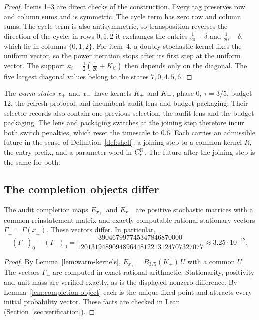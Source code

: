 \begin{proof}
Items 1--3 are direct checks of the construction. Every tag preserves row and column sums and is symmetric. The cycle term has zero row and column sums. The cycle term is also antisymmetric, so transposition reverses the direction of the cycle; in rows $0,1,2$ it exchanges the entries $\tfrac1{20}+\delta$ and $\tfrac1{20}-\delta$, which lie in columns $\{0,1,2\}$. For item~4, a doubly stochastic kernel fixes the uniform vector, so the power iteration stops after its first step at the uniform vector. The support $\kappa_i=\tfrac12(\tfrac1{20}+K_{ii})$ then depends only on the diagonal. The five largest diagonal values belong to the states $7,0,4,5,6$.
\end{proof}

The \emph{warm states} $x_{+}$ and $x_{-}$ have kernels $K_{+}$ and $K_{-}$, phase $0$, $\tau=3/5$, budget $12$, the refresh protocol, and incumbent audit lens and budget packaging. Their selector records also contain one previous selection, the audit lens and the budget packaging. The lens and packaging switches at the joining step therefore incur both switch penalties, which reset the timescale to $0.6$. Each carries an admissible future in the sense of Definition~\ref{def:shell}: a joining step to a common kernel $R$, the entry prefix, and a parameter word in $C_r^{\mathbb{N}}$. The future after the joining step is the same for both.

\subsection{The completion objects differ}

\begin{proposition}\label{prop:distinct-objects}
The audit completion maps $E_{x_{+}}$ and $E_{x_{-}}$ are positive stochastic matrices with a common reinstatement matrix and exactly computable rational stationary vectors $\Gamma_\pm=\Gamma(x_\pm)$. These vectors differ. In particular,
\[
(\Gamma_+)_0-(\Gamma_-)_0=\frac{390467997745347846870000}{120131948909489644812213124707327077}\approx3.25\cdot10^{-12}.
\]
\end{proposition}

\begin{proof}
By Lemma~\ref{lem:warm-kernels}, $E_{x_\pm}=B_{3/5}(K_\pm)\,U$ with a common $U$. The vectors $\Gamma_\pm$ are computed in exact rational arithmetic. Stationarity, positivity and unit mass are verified exactly, as is the displayed nonzero difference. By Lemma~\ref{lem:completion-object} each is the unique fixed point and attracts every initial probability vector. These facts are checked in Lean (Section~\ref{sec:verification}).
\end{proof}

